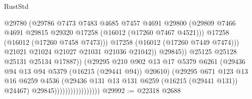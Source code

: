 \begin{lexlean}{RustStd}
\begin{coremodule}
                                                @29780
                                                (@29786
                                                  @7473
                                                  @7483
                                                  @4685
                                                  @7457
                                                  @4691
                                                  @29800
                                                  (@29809
                                                    @7466
                                                    @4691
                                                    @29815
                                                    @29320
                                                    @17258
                                                    (@16012 (@17260 @7467 @4521)))
                                                  @17258
                                                  (@16012 (@17260 @7458 @7473)))
                                                @17258
                                                (@16012 (@17260 @7449 @7474)))
                                              @21021
                                              @21024
                                              @21027
                                              @21031
                                              @21036
                                              @21042))
                                          @29845))
                                      @25125
                                      @25128
                                      @25131
                                      @25134
                                      @17887))
                                  (@29295
                                    @210
                                    @902
                                    @13
                                    @17
                                    @5379
                                    @6261
                                    (@29436 @94 @13 @94 @5379 (@16215 (@29441 @94)) @20610)
                                    (@29295
                                      @671
                                      @123
                                      @13
                                      @16
                                      @6259
                                      @4536
                                      (@29436 @131 @13 @131 @6259 (@16215 (@29441 @131)) @24467)
                                      @29845)))))))))))))))))
@29992 := @22318 @2688

\end{coremodule}
\end{lexlean}
